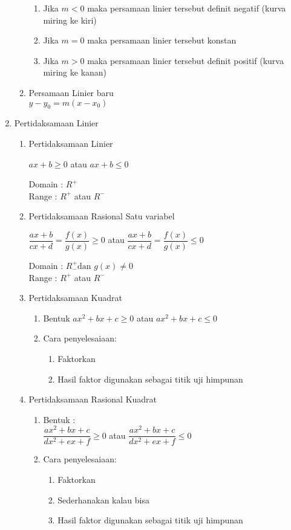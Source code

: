 \documentclass[12pt,a4paper,draft,final,oneside,twoside,openright,openany]{article}
\begin{document}
\begin{enumerate}
\begin{enumerate}
					\begin{enumerate}
						\item Jika $m<0$ maka persamaan linier tersebut definit negatif (kurva miring ke kiri)
						\item Jika $m=0$ maka persamaan linier tersebut konstan
						\item Jika $m>0$ maka persamaan linier tersebut definit positif (kurva miring ke kanan)
					\end{enumerate} 
					\item Persamaan Linier baru\\
					$y-y_0=m(x-x_0)$
				\end{enumerate}
			\item Pertidaksamaan Linier
				\begin{enumerate}
					\item Pertidaksamaan Linier\\
					\begin{center}
						$ax+b\geq 0$ atau $ax+b\leq 0$
					\end{center}
					Domain : $R^+$\\
					Range  : $R^+$ atau $R^-$
					
					\item Pertidaksamaan Rasional Satu variabel
					
					\begin{center}
						$\dfrac{ax+b}{cx+d}=\dfrac{f(x)}{g(x)}\geq 0$ atau
						$\dfrac{ax+b}{cx+d}=\dfrac{f(x)}{g(x)}\leq 0$ 
					\end{center}
					Domain : $R^+_- \text{dan }g(x)\neq0$\\
					Range : $R^+$ atau $R^-$
					\item Pertidaksamaan Kuadrat
					\begin{enumerate}
						\item Bentuk 
						$ax^2+bx+c\geq 0$ atau $ax^2+bx+c\leq 0$
						\item Cara penyelesaiaan:
						\begin{enumerate}
							\item Faktorkan
							\item Hasil faktor digunakan sebagai titik uji himpunan
						\end{enumerate}
					\end{enumerate}
					
					\item Pertidaksamaan Rasional Kuadrat
					\begin{enumerate}
						\item Bentuk :\\
						$\dfrac{ax^2+bx+c}{dx^2+ex+f}\geq 0$ atau $\dfrac{ax^2+bx+c}{dx^2+ex+f}\leq 0$
						\item Cara penyelesaiaan:
						\begin{enumerate}
							\item Faktorkan
							\item Sederhanakan kalau bisa
							\item Hasil faktor digunakan sebagai titik uji himpunan
						\end{enumerate}
					\end{enumerate}
							

\end{enumerate}
\end{enumerate}
\end{document}
